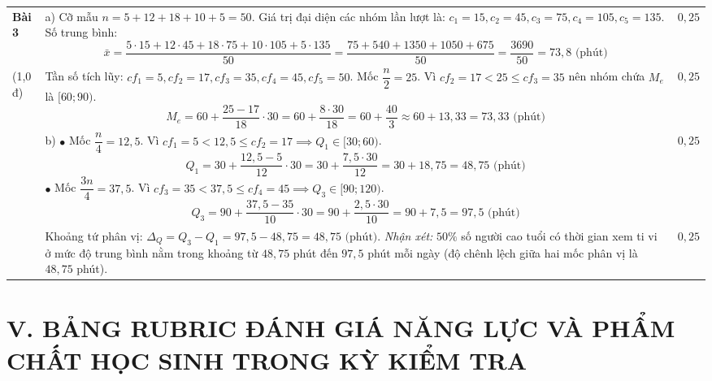 \documentclass[12pt, a4paper]{article}
\begin{document}
\begin{center}
\begin{tabularx}{\textwidth}{|p{1.2cm}|X|c|}
\textbf{Bài 3} & a) Cỡ mẫu $n = 5 + 12 + 18 + 10 + 5 = 50$. \newline
Giá trị đại diện các nhóm lần lượt là: $c_1 = 15, c_2 = 45, c_3 = 75, c_4 = 105, c_5 = 135$. \newline
Số trung bình:
$$\bar{x} = \dfrac{5 \cdot 15 + 12 \cdot 45 + 18 \cdot 75 + 10 \cdot 105 + 5 \cdot 135}{50} = \dfrac{75 + 540 + 1350 + 1050 + 675}{50} = \dfrac{3690}{50} = 73{,}8 \text{ (phút)}$$ & $0{,}25$ \\ \cline{2-3}
(1,0 đ) & Tần số tích lũy: $cf_1 = 5, cf_2 = 17, cf_3 = 35, cf_4 = 45, cf_5 = 50$. \newline
Mốc $\dfrac{n}{2} = 25$. Vì $cf_2 = 17 < 25 \le cf_3 = 35$ nên nhóm chứa $M_e$ là $[60; 90)$. \newline
$$M_e = 60 + \dfrac{25 - 17}{18} \cdot 30 = 60 + \dfrac{8 \cdot 30}{18} = 60 + \dfrac{40}{3} \approx 60 + 13{,}33 = 73{,}33 \text{ (phút)}$$ & $0{,}25$ \\ \cline{2-3}
& b) $\bullet$ Mốc $\dfrac{n}{4} = 12{,}5$. Vì $cf_1 = 5 < 12{,}5 \le cf_2 = 17 \implies Q_1 \in [30; 60)$.
$$Q_1 = 30 + \dfrac{12{,}5 - 5}{12} \cdot 30 = 30 + \dfrac{7{,}5 \cdot 30}{12} = 30 + 18{,}75 = 48{,}75 \text{ (phút)}$$
$\bullet$ Mốc $\dfrac{3n}{4} = 37{,}5$. Vì $cf_3 = 35 < 37{,}5 \le cf_4 = 45 \implies Q_3 \in [90; 120)$.
$$Q_3 = 90 + \dfrac{37{,}5 - 35}{10} \cdot 30 = 90 + \dfrac{2{,}5 \cdot 30}{10} = 90 + 7{,}5 = 97{,}5 \text{ (phút)}$$ & $0{,}25$ \\ \cline{2-3}
& Khoảng tứ phân vị: $\Delta_Q = Q_3 - Q_1 = 97{,}5 - 48{,}75 = 48{,}75 \text{ (phút)}$. \newline
\textit{Nhận xét:} $50\%$ số người cao tuổi có thời gian xem ti vi ở mức độ trung bình nằm trong khoảng từ $48{,}75$ phút đến $97{,}5$ phút mỗi ngày (độ chênh lệch giữa hai mốc phân vị là $48{,}75$ phút). & $0{,}25$ \\ \hline
\end{tabularx}
\end{center}

\section*{V. BẢNG RUBRIC ĐÁNH GIÁ NĂNG LỰC VÀ PHẨM CHẤT HỌC SINH TRONG KỲ KIỂM TRA}
\end{document}
